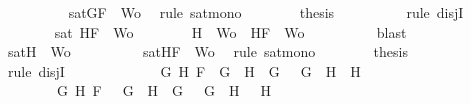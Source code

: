 \begin{isabellebody}
\ \ \ \ \ \ \ \ \isamarkupfalse%
\ {\isacartoucheopen}sat{\isacharparenleft}{\isacharbraceleft}G{\isacharcomma}F{\isacharbraceright}\ {\isasymunion}\ Wo{\isacharparenright}{\isacartoucheclose}\ \isamarkupfalse%
\ {\isacharparenleft}rule\ sat{\isacharunderscore}mono{\isacharparenright}\isanewline
\ \ \ \ \ \ \isamarkupfalse%
\ {\isacharquery}thesis\isanewline
\ \ \ \ \ \ \ \ \isamarkupfalse%
\ {\isacharparenleft}rule\ disjI{}{\isacharparenright}\isanewline
\ \ \ \ \isamarkupfalse%
\isanewline
\ \ \ \ \ \ \isamarkupfalse%
\ {\isachardoublequoteopen}sat\ {\isacharparenleft}{\isacharbraceleft}H{\isacharcomma}F{\isacharbraceright}\ {\isasymunion}\ Wo{\isacharparenright}{\isachardoublequoteclose}\isanewline
\ \ \ \ \ \ \isamarkupfalse%
\ {\isachardoublequoteopen}{\isacharbraceleft}H{\isacharbraceright}\ {\isasymunion}\ Wo\ {\isasymsubseteq}\ {\isacharbraceleft}H{\isacharcomma}F{\isacharbraceright}\ {\isasymunion}\ Wo{\isachardoublequoteclose}\isanewline
\ \ \ \ \ \ \ \ \isamarkupfalse%
\ blast\isanewline
\ \ \ \ \ \ \isamarkupfalse%
\ \isamarkupfalse%
\ {\isachardoublequoteopen}sat{\isacharparenleft}{\isacharbraceleft}H{\isacharbraceright}\ {\isasymunion}\ Wo{\isacharparenright}{\isachardoublequoteclose}\isanewline
\ \ \ \ \ \ \ \ \isamarkupfalse%
\ {\isacartoucheopen}sat{\isacharparenleft}{\isacharbraceleft}H{\isacharcomma}F{\isacharbraceright}\ {\isasymunion}\ Wo{\isacharparenright}{\isacartoucheclose}\ \isamarkupfalse%
\ {\isacharparenleft}rule\ sat{\isacharunderscore}mono{\isacharparenright}\isanewline
\ \ \ \ \ \ \isamarkupfalse%
\ {\isacharquery}thesis\isanewline
\ \ \ \ \ \ \ \ \isamarkupfalse%
\ {\isacharparenleft}rule\ disjI{}{\isacharparenright}\isanewline
\ \ \ \ \isamarkupfalse%
\isanewline
\ \ \isamarkupfalse%
\isanewline
\ \ \ \ \isamarkupfalse%
\ {\isachardoublequoteopen}{\isacharparenleft}{\isasymexists}G{}\ H{}{\isachardot}\ F\ {\isacharequal}\ G{}\ \isactrlbold {\isasymrightarrow}\ H{}\ {\isasymand}\ G\ {\isacharequal}\ \isactrlbold {\isasymnot}\ G{}\ {\isasymand}\ H\ {\isacharequal}\ H{}{\isacharparenright}\ {\isasymor}\ \isanewline
\ \ \ \ \ \ \ \ {\isacharparenleft}{\isasymexists}G{}\ H{}{\isachardot}\ F\ {\isacharequal}\ \isactrlbold {\isasymnot}\ {\isacharparenleft}G{}\ \isactrlbold {\isasymand}\ H{}{\isacharparenright}\ {\isasymand}\ G\ {\isacharequal}\ \isactrlbold {\isasymnot}\ G{}\ {\isasymand}\ H\ {\isacharequal}\ \isactrlbold {\isasymnot}\ H{}{\isacharparenright}\ {\isasymor}\ \isanewline

\end{isabellebody}
